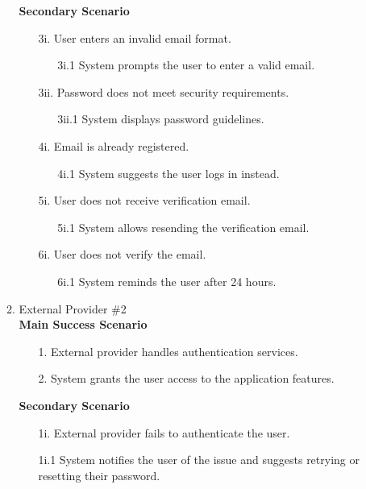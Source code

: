 \documentclass[]{article}
\begin{document}
\begin{enumerate}[{\bf BE1.}]
\begin{enumerate}[{\bf VP1.}]
	\textbf{Secondary Scenario}
	\begin{enumerate}
		\item[3i.] User enters an invalid email format.
		\begin{enumerate}
			\item[3i.1] System prompts the user to enter a valid email.
		\end{enumerate}
		\item[3ii.] Password does not meet security requirements.
		\begin{enumerate}
			\item[3ii.1] System displays password guidelines.
		\end{enumerate}
		\item[4i.] Email is already registered.
		\begin{enumerate}
			\item[4i.1] System suggests the user logs in instead.
		\end{enumerate}
		\item[5i.] User does not receive verification email.
		\begin{enumerate}
			\item[5i.1] System allows resending the verification email.
		\end{enumerate}
		\item[6i.] User does not verify the email.
		\begin{enumerate}
			\item[6i.1] System reminds the user after 24 hours.
		\end{enumerate}
	\end{enumerate}

    \item External Provider \#2 \\
        \textbf{Main Success Scenario}
	\begin{enumerate}
		\item [1. ]External provider handles authentication services.
            \item [2. ] System grants the user access to the application features.
	\end{enumerate}
        \textbf{Secondary Scenario}
	\begin{enumerate}
		\item [1i. ]External provider fails to authenticate the user.
            \item [1i.1 ] System notifies the user of the issue and suggests retrying or resetting their password.
	\end{enumerate}      
        

\end{enumerate}
\end{enumerate}
\end{document}
